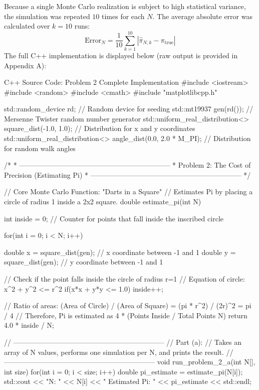 \documentclass{article}
\begin{document}
Because a single Monte Carlo realization is subject to high statistical variance, the simulation was repeated $10$ times for each $N$. The average absolute error was calculated over $k=10$ runs:
\begin{equation}
    \text{Error}_N = \frac{1}{10} \sum_{k=1}^{10} |\hat{\pi}_{N,k} - \pi_{\text{true}}|
\end{equation}
The full C++ implementation is displayed below (raw output is provided in Appendix A):
\newpage
\begin{codebox}{C++ Source Code: Problem 2 Complete Implementation}
#include <iostream>
#include <random>
#include <cmath> 
#include "matplotlibcpp.h"

std::random_device rd; // Random device for seeding
std::mt19937 gen(rd()); // Mersenne Twister random number generator
std::uniform_real_distribution<> square_dist(-1.0, 1.0); // Distribution for x and y coordinates
std::uniform_real_distribution<> angle_dist(0.0, 2.0 * M_PI); // Distribution for random walk angles

/* 
 * -----------------------------------------------------------------
 * Problem 2: The Cost of Precision (Estimating Pi)
 * -----------------------------------------------------------------
 */

// Core Monte Carlo Function: "Darts in a Square"
// Estimates Pi by placing a circle of radius 1 inside a 2x2 square.
double estimate_pi(int N){
    
   

    int inside = 0; // Counter for points that fall inside the inscribed circle

    for(int i = 0; i < N; i++){
        double x = square_dist(gen); // x coordinate between -1 and 1
        double y = square_dist(gen); // y coordinate between -1 and 1

        // Check if the point falls inside the circle of radius r=1
        // Equation of circle: x^2 + y^2 <= r^2
        if(x*x + y*y <= 1.0){
            inside++;
        }
    }

    // Ratio of areas: (Area of Circle) / (Area of Square) = (pi * r^2) / (2r)^2 = pi / 4
    // Therefore, Pi is estimated as 4 * (Points Inside / Total Points N)
    return 4.0 * inside / N;
}


// -----------------------------------------------------------------
// Part (a): 
// Takes an array of N values, performs one simulation per N, and prints the result.
// -----------------------------------------------------------------
void run_problem_2_a(int N[], int size){
    for(int i = 0; i < size; i++){
        double pi_estimate = estimate_pi(N[i]);
        std::cout << "N: " << N[i] << " Estimated Pi: " << pi_estimate << std::endl;
    }
}



\end{codebox}
\end{document}
